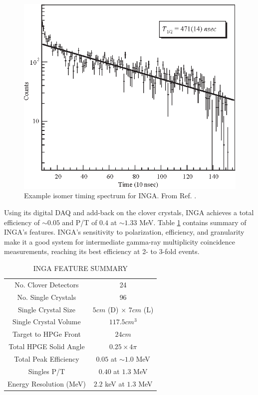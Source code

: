 \begin{figure}[h!]
	\centerline{\includegraphics[height=0.35\textheight]{./img/c3/INGA_isomer.eps}}
	\caption{Example isomer timing spectrum for INGA. From Ref. \cite{IngaDigitalDAQ}.}
	\label{fig:chp3-INGA-isomer}
\end{figure}

Using its digital DAQ and add-back on the clover crystals, INGA achieves a total efficiency of $\sim0.05$ and P/T of $0.4$ at $\sim1.33$ MeV. Table \ref{tbl:inga-summary} contains summary of INGA's features. INGA's sensitivity to polarization, efficiency, and granularity make it a good system for intermediate gamma-ray multiplicity coincidence measurements, reaching its best efficiency at 2- to 3-fold events.

\begin{table}[ht!]
\caption{INGA FEATURE SUMMARY\label{tbl:inga-summary}}
\begin{center}
\begin{tabular}{|c|c|}
\hline
\hline
No. Clover Detectors      & 24\\ 
No. Single Crystals       & 96\\ 
Single Crystal Size       & $5 cm$ (D) $\times$ $7 cm$ (L) \\
Single Crystal Volume     & $117.5 cm^3$\\
Target to HPGe Front      & $24 cm$\\ 
Total HPGE Solid Angle    & $0.25 \times 4\pi$\\ 
Total Peak Efficiency     & $0.05$ at $\sim1.0$ MeV\\ 
Singles P/T               & $0.40$ at $1.3$ MeV \\ 
Energy Resolution (MeV)   & $2.2$ keV at $1.3$ MeV \\ 
\hline 
\hline 
\end{tabular}
\end{center}
\end{table}

